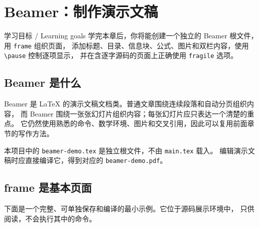 \section{Beamer：制作演示文稿}

\begin{learningbox}{学习目标 / Learning goals}
学完本章后，你将能创建一个独立的 Beamer 根文件，用 \texttt{frame} 组织页面，
添加标题、目录、信息块、公式、图片和双栏内容，使用 \verb|\pause| 控制逐项显示，
并在含逐字源码的页面上正确使用 \texttt{fragile} 选项。
\end{learningbox}

\subsection{Beamer 是什么}

Beamer 是 LaTeX 的演示文稿文档类。普通文章围绕连续段落和自动分页组织内容，
而 Beamer 围绕一张张幻灯片组织内容；每张幻灯片应只表达一个清楚的重点。
它仍然使用熟悉的命令、数学环境、图片和交叉引用，因此可以复用前面章节的写作方法。

本项目中的 \texttt{beamer-demo.tex} 是独立根文件，不由 \texttt{main.tex} 载入。
编辑演示文稿时应直接编译它，得到对应的 \texttt{beamer-demo.pdf}。

\subsection{frame 是基本页面}

下面是一个完整、可单独保存和编译的最小示例。它位于源码展示环境中，
只供阅读，不会执行其中的命令。


